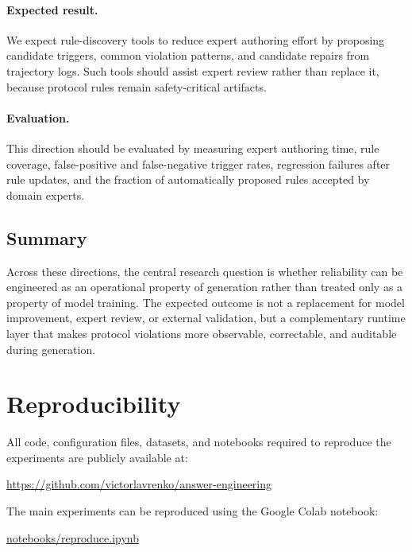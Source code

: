 \documentclass[twocolumn]{article}
\begin{document}
\paragraph{Expected result.}
We expect rule-discovery tools to reduce expert authoring effort by proposing
candidate triggers, common violation patterns, and candidate repairs from
trajectory logs. Such tools should assist expert review rather than replace it,
because protocol rules remain safety-critical artifacts.

\paragraph{Evaluation.}
This direction should be evaluated by measuring expert authoring time, rule
coverage, false-positive and false-negative trigger rates, regression failures
after rule updates, and the fraction of automatically proposed rules accepted by
domain experts.

\subsection{Summary}

Across these directions, the central research question is whether reliability
can be engineered as an operational property of generation rather than treated
only as a property of model training. The expected outcome is not a replacement
for model improvement, expert review, or external validation, but a
complementary runtime layer that makes protocol violations more observable,
correctable, and auditable during generation.

\section{Reproducibility}\label{sec:reproducibility}

All code, configuration files, datasets, and notebooks required to reproduce
the experiments are publicly available at:

\begin{center}
\href{https://github.com/victorlavrenko/answer-engineering}
{https://github.com/victorlavrenko/answer-engineering}
\end{center}

The main experiments can be reproduced using the Google Colab notebook:

\begin{center}
\href{https://colab.research.google.com/github/victorlavrenko/answer-engineering/blob/main/notebooks/reproduce.ipynb}
{notebooks/reproduce.ipynb}
\end{center}
\end{document}
